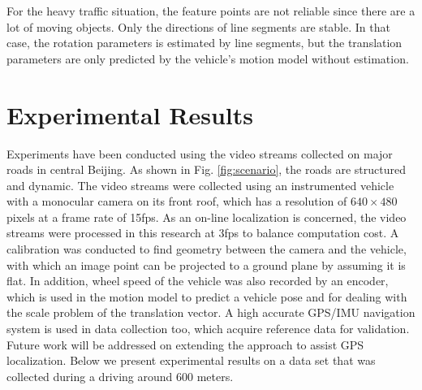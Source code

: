 \documentclass[letterpaper, 10 pt, conference]{ieeeconf}  %
\begin{document}

For the heavy traffic situation, the feature points are not reliable since there are a lot of moving objects. Only the directions of line segments are stable. In that case, the rotation parameters is estimated by line segments, but the translation parameters are only predicted by the vehicle's motion model without estimation.



\section{Experimental Results}

Experiments have been conducted using the video streams collected on major roads in central Beijing. As shown in Fig. \ref{fig:scenario}, the roads are structured and dynamic. The video streams were collected using an instrumented vehicle with a monocular camera on its front roof, which has a resolution of $640\times480$ pixels at a frame rate of 15fps. As an on-line localization is concerned, the video streams were processed in this research at 3fps to balance computation cost. A calibration was conducted to find geometry between the camera and the vehicle, with which an image point can be projected to a ground plane by assuming it is flat. In addition, wheel speed of the vehicle was also recorded by an encoder, which is used in the motion model to predict a vehicle pose and for dealing with the scale problem of the translation vector. A high accurate GPS/IMU navigation system is used in data collection too, which acquire reference data for validation. Future work will be addressed on extending the approach to assist GPS localization. Below we present experimental results on a data set that was collected during a driving around 600 meters.
\end{document}

